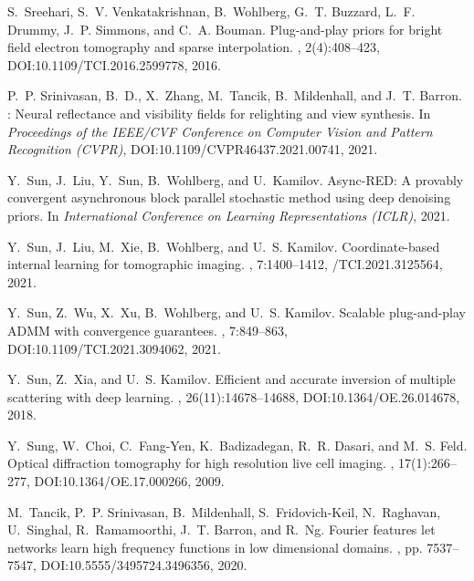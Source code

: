 \documentclass[11pt]{article}
\theoremstyle{plain} %
\begin{document}
\begin{thebibliography}{10}
S.~Sreehari, S.~V. Venkatakrishnan, B.~Wohlberg, G.~T. Buzzard, L.~F. Drummy, J.~P. Simmons, and C.~A. Bouman.
\newblock Plug-and-play priors for bright field electron tomography and sparse interpolation.
, 2(4):408--423,
\newblock DOI:10.1109/TCI.2016.2599778,
2016.

P.~P. Srinivasan, B.~D., X.~Zhang, M.~Tancik, B.~Mildenhall, and J.~T. Barron.
: Neural reflectance and visibility fields for relighting and view synthesis.
\newblock In {\em Proceedings of the IEEE/CVF Conference on Computer Vision and Pattern Recognition (CVPR)},
\newblock DOI:10.1109/CVPR46437.2021.00741,
2021.

Y.~Sun, J.~Liu, Y.~Sun, B.~Wohlberg, and U.~Kamilov.
\newblock Async-{RED}: A provably convergent asynchronous block parallel stochastic method using deep denoising priors.
\newblock In {\em International Conference on Learning Representations (ICLR)}, 2021.

Y.~Sun, J.~Liu, M.~Xie, B.~Wohlberg, and U.~S. Kamilov.
 Coordinate-based internal learning for tomographic imaging.
, 7:1400--1412,
/TCI.2021.3125564,
2021.

Y.~Sun, Z.~Wu, X.~Xu, B.~Wohlberg, and U.~S. Kamilov.
\newblock Scalable plug-and-play {ADMM} with convergence guarantees.
, 7:849--863,
\newblock DOI:10.1109/TCI.2021.3094062,
2021.

Y.~Sun, Z.~Xia, and U.~S. Kamilov.
\newblock Efficient and accurate inversion of multiple scattering with deep learning.
, 26(11):14678--14688,
\newblock DOI:10.1364/OE.26.014678,
2018.

Y.~Sung, W.~Choi, C.~Fang-Yen, K.~Badizadegan, R.~R. Dasari, and M.~S. Feld.
\newblock Optical diffraction tomography for high resolution live cell imaging.
, 17(1):266--277, 
\newblock DOI:10.1364/OE.17.000266,
2009.

M.~Tancik, P.~P. Srinivasan, B.~Mildenhall, S.~Fridovich-Keil, N.~Raghavan, U.~Singhal, R.~Ramamoorthi, J.~T. Barron, and R.~Ng.
\newblock Fourier features let networks learn high frequency functions in low dimensional domains.
, pp. 7537--7547,
\newblock DOI:10.5555/3495724.3496356,
2020.


\end{thebibliography}
\end{document}
